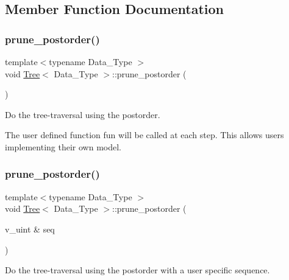 \subsection{Member Function Documentation}
\mbox{\label{classTree_a7e50f34814e6f158cbff23dbe0312a8e}} 
\subsubsection{\texorpdfstring{prune\+\_\+postorder()}{prune\_postorder()}\hspace{0.1cm}{\footnotesize\ttfamily [1/2]}}
{\footnotesize\ttfamily template$<$typename Data\+\_\+\+Type $>$ \\
void \hyperlink{classTree}{Tree}$<$ Data\+\_\+\+Type $>$\+::prune\+\_\+postorder (\begin{DoxyParamCaption}{ }\end{DoxyParamCaption})\hspace{0.3cm}{\ttfamily [inline]}}



Do the tree-\/traversal using the postorder. 

The user defined function {\ttfamily fun} will be called at each step. This allows users implementing their own model. \mbox{\label{classTree_af3b41db2b06a4cac7f2cdb25963e3e3c}} 
\subsubsection{\texorpdfstring{prune\+\_\+postorder()}{prune\_postorder()}\hspace{0.1cm}{\footnotesize\ttfamily [2/2]}}
{\footnotesize\ttfamily template$<$typename Data\+\_\+\+Type $>$ \\
void \hyperlink{classTree}{Tree}$<$ Data\+\_\+\+Type $>$\+::prune\+\_\+postorder (\begin{DoxyParamCaption}\item[{v\+\_\+uint \&}]{seq }\end{DoxyParamCaption})\hspace{0.3cm}{\ttfamily [inline]}}



Do the tree-\/traversal using the postorder with a user specific sequence. 

